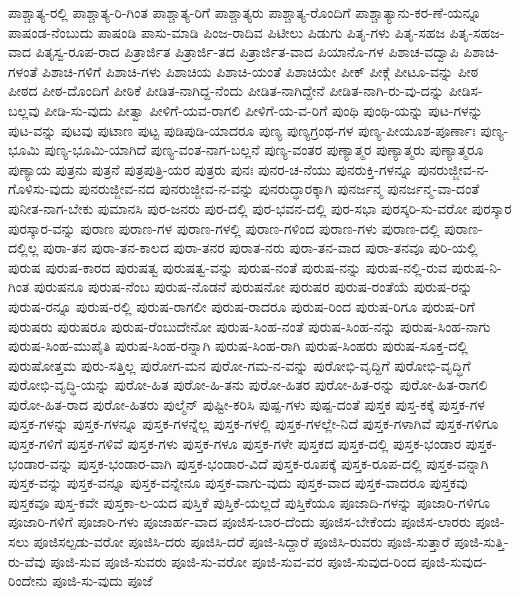 {ಪಾಶ್ಚಾತ್ಯ-ರಲ್ಲಿ
ಪಾಶ್ಚಾತ್ಯ-ರಿ-ಗಿಂತ
ಪಾಶ್ಚಾತ್ಯ-ರಿಗೆ
ಪಾಶ್ಚಾತ್ಯರು
ಪಾಶ್ಚಾತ್ಯ-ರೊಂದಿಗೆ
ಪಾಶ್ಚಾತ್ಯಾನು-ಕರ-ಣೆ-ಯನ್ನೂ
ಪಾಷಂಡ-ನೆಂಬುದು
ಪಾಷಂಡಿ
ಪಾಸು-ಮಾಡಿ
ಪಿಂಜ-ರಾದಿವ
ಪಿಟೀಲು
ಪಿಡುಗು
ಪಿತೃ-ಗಳು
ಪಿತೃ-ಸಹಜ
ಪಿತೃ-ಸಹಜ-ವಾದ
ಪಿತೃಸ್ವ-ರೂಪ-ರಾದ
ಪಿತ್ರಾರ್ಜಿತ
ಪಿತ್ರಾರ್ಜಿ-ತದ
ಪಿತ್ರಾರ್ಜಿತ-ವಾದ
ಪಿಯಾನೊ-ಗಳ
ಪಿಶಾಚ-ವದ್ವಾಪಿ
ಪಿಶಾಚಿ-ಗಳಂತೆ
ಪಿಶಾಚಿ-ಗಳಿಗೆ
ಪಿಶಾಚಿ-ಗಳು
ಪಿಶಾಚಿಯ
ಪಿಶಾಚಿ-ಯಂತೆ
ಪಿಶಾಚಿಯೇ
ಪೀಕ್
ಪೀಕ್ಗೆ
ಪೀಟೂ-ವನ್ನು
ಪೀಠ
ಪೀಠದ
ಪೀಠ-ದೊಂದಿಗೆ
ಪೀಠಿಕೆ
ಪೀಡಿತ-ನಾಗಿದ್ದ-ನೆಂದು
ಪೀಡಿತ-ನಾಗಿದ್ದೇನೆ
ಪೀಡಿತ-ನಾಗಿ-ರು-ವು-ದನ್ನು
ಪೀಡಿಸ-ಬಲ್ಲವು
ಪೀಡಿ-ಸು-ವುದು
ಪೀತ್ವಾ
ಪೀಳಿಗೆ-ಯವ-ರಾಗಲಿ
ಪೀಳಿಗೆ-ಯ-ವ-ರಿಗೆ
ಪುಂಥಿ
ಪುಂಥಿ-ಯನ್ನು
ಪುಟ-ಗಳನ್ನು
ಪುಟ-ವನ್ನು
ಪುಟವು
ಪುಟಾಣ
ಪುಟ್ಟ
ಪುಡಿಪುಡಿ-ಯಾದರೂ
ಪುಣ್ಯ
ಪುಣ್ಯಗ್ರಂಥ-ಗಳ
ಪುಣ್ಯ-ಪೀಯೂಶ-ಪೂರ್ಣಾಃ
ಪುಣ್ಯ-ಭೂಮಿ
ಪುಣ್ಯ-ಭೂಮಿ-ಯಾಗಿದೆ
ಪುಣ್ಯ-ವಂತ-ನಾಗ-ಬಲ್ಲನೆ
ಪುಣ್ಯ-ವಂತರ
ಪುಣ್ಯಾತ್ಮರ
ಪುಣ್ಯಾತ್ಮರು
ಪುಣ್ಯಾತ್ಮರೂ
ಪುಣ್ಯಾಯ
ಪುತ್ರನು
ಪುತ್ರನೆ
ಪುತ್ರಪುತ್ರಿ-ಯರ
ಪುತ್ರರು
ಪುನಃ
ಪುನರ-ಚ-ನೆಯು
ಪುನರುಕ್ತಿ-ಗಳನ್ನೂ
ಪುನರುಜ್ಜೀವ-ನ-ಗೊಳಿಸು-ವುದು
ಪುನರುಜ್ಜೀವ-ನದ
ಪುನರುಜ್ಜೀವ-ನ-ವನ್ನು
ಪುನರುದ್ಧಾರಕ್ಕಾಗಿ
ಪುನರ್ಜನ್ಮ
ಪುನರ್ಜನ್ಮ-ವಾ-ದಂತೆ
ಪುನೀತ-ನಾಗ-ಬೇಕು
ಪುಮಾನಸಿ
ಪುರ-ಜನರು
ಪುರ-ದಲ್ಲಿ
ಪುರ-ಭವನ-ದಲ್ಲಿ
ಪುರ-ಸಭಾ
ಪುರಸ್ಕರಿ-ಸು-ವರೋ
ಪುರಸ್ಕಾರ
ಪುರಸ್ಕಾರ-ವನ್ನು
ಪುರಾಣ
ಪುರಾಣ-ಗಳ
ಪುರಾಣ-ಗಳಲ್ಲಿ
ಪುರಾಣ-ಗಳಿಂದ
ಪುರಾಣ-ಗಳು
ಪುರಾಣ-ದಲ್ಲಿ
ಪುರಾಣ-ದಲ್ಲಿಲ್ಲ
ಪುರಾ-ತನ
ಪುರಾ-ತನ-ಕಾಲದ
ಪುರಾ-ತನರ
ಪುರಾತ-ನರು
ಪುರಾ-ತನ-ವಾದ
ಪುರಾ-ತನವೂ
ಪುರಿ-ಯಲ್ಲಿ
ಪುರುಷ
ಪುರುಷ-ಕಾರದ
ಪುರುಷತ್ವ
ಪುರುಷತ್ವ-ವನ್ನು
ಪುರುಷ-ನಂತೆ
ಪುರುಷ-ನನ್ನು
ಪುರುಷ-ನಲ್ಲಿ-ರುವ
ಪುರುಷ-ನಿ-ಗಿಂತ
ಪುರುಷನೂ
ಪುರುಷ-ನೆಂಬ
ಪುರುಷ-ನೊಡನೆ
ಪುರುಷನೋ
ಪುರುಷರ
ಪುರುಷ-ರಂತೆಯೆ
ಪುರುಷ-ರನ್ನು
ಪುರುಷ-ರನ್ನೂ
ಪುರುಷ-ರಲ್ಲಿ
ಪುರುಷ-ರಾಗಲೀ
ಪುರುಷ-ರಾದರೂ
ಪುರುಷ-ರಿಂದ
ಪುರುಷ-ರಿಗೂ
ಪುರುಷ-ರಿಗೆ
ಪುರುಷರು
ಪುರುಷರೂ
ಪುರುಷ-ರೆಂಬುದೇನೋ
ಪುರುಷ-ಸಿಂಹ-ನಂತೆ
ಪುರುಷ-ಸಿಂಹ-ನನ್ನು
ಪುರುಷ-ಸಿಂಹ-ನಾಗು
ಪುರುಷ-ಸಿಂಹ-ಮುಪೈತಿ
ಪುರುಷ-ಸಿಂಹ-ರನ್ನಾಗಿ
ಪುರುಷ-ಸಿಂಹ-ರಾಗಿ
ಪುರುಷ-ಸಿಂಹರು
ಪುರುಷ-ಸೂಕ್ತ-ದಲ್ಲಿ
ಪುರುಷೋತ್ತಮ
ಪುರು-ಸತ್ತಿಲ್ಲ
ಪುರೋಗ-ಮನ
ಪುರೋ-ಗಮ-ನ-ವನ್ನು
ಪುರೋಭಿ-ವೃದ್ದಿಗೆ
ಪುರೋಭಿ-ವೃದ್ಧಿಗೆ
ಪುರೋಭಿ-ವೃದ್ಧಿ-ಯನ್ನು
ಪುರೋ-ಹಿತ
ಪುರೋ-ಹಿ-ತನು
ಪುರೋ-ಹಿತರ
ಪುರೋ-ಹಿತ-ರನ್ನು
ಪುರೋ-ಹಿತ-ರಾಗಲಿ
ಪುರೋ-ಹಿತ-ರಾದ
ಪುರೋ-ಹಿತರು
ಪುಲ್ಮೆನ್
ಪುಷ್ಟೀ-ಕರಿಸಿ
ಪುಷ್ಪ-ಗಳು
ಪುಷ್ಪ-ದಂತೆ
ಪುಸ್ತಕ
ಪುಸ್ತ-ಕಕ್ಕೆ
ಪುಸ್ತಕ-ಗಳ
ಪುಸ್ತಕ-ಗಳನ್ನು
ಪುಸ್ತಕ-ಗಳನ್ನೂ
ಪುಸ್ತಕ-ಗಳನ್ನೆಲ್ಲ
ಪುಸ್ತಕ-ಗಳಲ್ಲಿ
ಪುಸ್ತಕ-ಗಳಲ್ಲೇ-ನಿದೆ
ಪುಸ್ತಕ-ಗಳಾಗಿವೆ
ಪುಸ್ತಕ-ಗಳಿಗೂ
ಪುಸ್ತಕ-ಗಳಿಗೆ
ಪುಸ್ತಕ-ಗಳಿವೆ
ಪುಸ್ತಕ-ಗಳು
ಪುಸ್ತಕ-ಗಳೂ
ಪುಸ್ತಕ-ಗಳೇ
ಪುಸ್ತಕದ
ಪುಸ್ತಕ-ದಲ್ಲಿ
ಪುಸ್ತಕ-ಭಂಡಾರ
ಪುಸ್ತಕ-ಭಂಡಾರ-ವನ್ನು
ಪುಸ್ತಕ-ಭಂಡಾರ-ವಾಗಿ
ಪುಸ್ತಕ-ಭಂಡಾರ-ವಿದೆ
ಪುಸ್ತಕ-ರೂಪಕ್ಕೆ
ಪುಸ್ತಕ-ರೂಪ-ದಲ್ಲಿ
ಪುಸ್ತಕ-ವನ್ನಾಗಿ
ಪುಸ್ತಕ-ವನ್ನು
ಪುಸ್ತಕ-ವನ್ನೂ
ಪುಸ್ತಕ-ವನ್ನೇನೂ
ಪುಸ್ತಕ-ವಾಗು-ವುದು
ಪುಸ್ತಕ-ವಾದ
ಪುಸ್ತಕ-ವಾದರೂ
ಪುಸ್ತಕವು
ಪುಸ್ತಕವೂ
ಪುಸ್ತ-ಕವೇ
ಪುಸ್ತಕಾ-ಲ-ಯದ
ಪುಸ್ತಿಕೆ
ಪುಸ್ತಿಕೆ-ಯಲ್ಲದೆ
ಪುಸ್ತಿಕೆಯೂ
ಪೂಜಾದಿ-ಗಳನ್ನು
ಪೂಜಾರಿ-ಗಳಿಗೂ
ಪೂಜಾರಿ-ಗಳಿಗೆ
ಪೂಜಾರಿ-ಗಳು
ಪೂಜಾರ್ಹ-ವಾದ
ಪೂಜಿಸ-ಬಾರ-ದೆಂದು
ಪೂಜಿಸ-ಬೇಕೆಂದು
ಪೂಜಿಸ-ಲಾರರು
ಪೂಜಿ-ಸಲು
ಪೂಜಿಸಲ್ಪಡು-ವರೋ
ಪೂಜಿಸಿ-ದರು
ಪೂಜಿಸಿ-ದರೆ
ಪೂಜಿ-ಸಿದ್ದಾರೆ
ಪೂಜಿಸಿ-ರುವರು
ಪೂಜಿ-ಸುತ್ತಾರೆ
ಪೂಜಿ-ಸುತ್ತಿ-ರು-ವೆವು
ಪೂಜಿ-ಸುವ
ಪೂಜಿ-ಸುವರು
ಪೂಜಿ-ಸು-ವರೋ
ಪೂಜಿ-ಸುವ-ವರ
ಪೂಜಿ-ಸುವುದ-ರಿಂದ
ಪೂಜಿ-ಸುವುದ-ರಿಂದೇನು
ಪೂಜಿ-ಸು-ವುದು
ಪೂಜೆ
}
